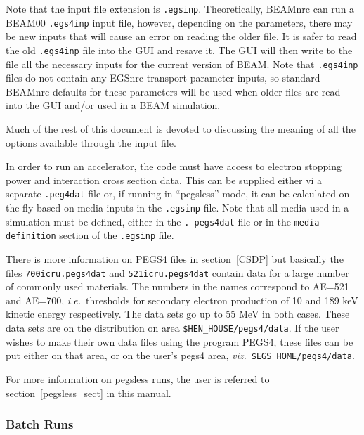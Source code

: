 \documentclass[12pt,twoside]{article}
\newcommand{\ie}{{\em i.e.}}
\newcommand{\viz}{{\em viz.}}
\begin{document}
Note that the input file extension is {\tt .egsinp}.  Theoretically, BEAMnrc
can run a BEAM00 {\tt .egs4inp} input file, however, depending on the
parameters, there may be new inputs that will cause an error on reading
the older file.  It is safer to read the old {\tt .egs4inp} file
into the GUI and resave it.  The GUI will then write to the file all the necessary inputs for
the current version of BEAM.  Note that {\tt .egs4inp} files do not
contain any EGSnrc transport parameter inputs, so standard BEAMnrc
defaults for these parameters will be used when older files are read
into the GUI and/or used in a BEAM simulation.

Much of the rest of this document is devoted to discussing the meaning
of all the options available through the input file.

In order to run an accelerator, the code must have access to electron stopping
power and interaction cross section data.  This can be supplied either vi a
separate {\tt .peg4dat} file or, if running in ``pegsless'' mode, it can be
calculated on the fly based on media inputs in the {\tt .egsinp} file. Note that
all media used in a simulation must be defined, either in the {\tt. pegs4dat}
file or in the {\tt media definition} section of the {\tt .egsinp} file.

There is more information on PEGS4 files in section~\ref{CSDP}
but basically
the files \verb+700icru.pegs4dat+ and \verb+521icru.pegs4dat+
contain data for a large number of
commonly used materials. The numbers in the names correspond to AE=521
and AE=700, \ie\ thresholds for secondary electron production of 10 and
189 keV kinetic energy respectively. The data sets go up to 55 MeV in
both cases.  These data sets are on the distribution on area
\verb+$HEN_HOUSE/pegs4/data+.  If the user wishes to make their own data
files using the program PEGS4,
these files can be put either on that area, or on the user's pegs4
area, \viz\ \verb+$EGS_HOME/pegs4/data+.

For more information on pegsless runs, the user is referred to
section~\ref{pegsless_sect} in this manual.

\subsubsection{Batch Runs}
\label{batchsect}
\end{document}
